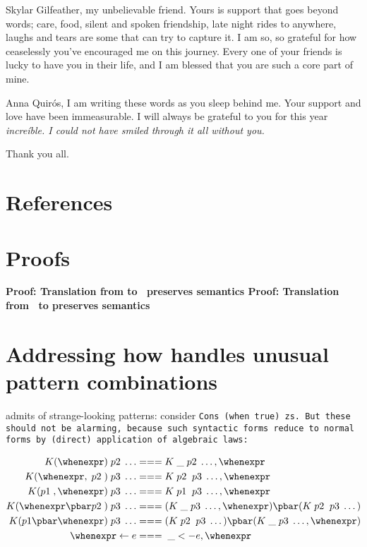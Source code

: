 \documentclass[manuscript,screen,review, 12pt, nonacm]{acmart}
\begin{document}
Skylar Gilfeather, my unbelievable friend. Yours is support that goes
beyond words; care, food, silent and spoken friendship, late night rides to
anywhere, laughs and tears are some that can try to capture it. I am so, so
grateful for how ceaselessly you've encouraged me on this journey. Every one
of your friends is lucky to have you in their life, and I am blessed that 
you are such a core part of mine. 

Anna Quirós, I am writing these words as you sleep behind me. Your support
and love have been immeasurable. I will always be grateful to you for this
year \it{increíble}. I could not have smiled through it all without you. 

Thank you all. 

\section{References}



\renewcommand\thesection{\Alph{section}}
\setcounter{section}{0}
\section{Proofs}
\begin{outline}
\1 \bf{Proof: Translation from \VMinus to \D\ preserves semantics }
\1 \bf{Proof: Translation from \PPlus\ to \VMinus preserves semantics }
\end{outline}

\section{Addressing how \PPlus handles unusual pattern combinations}
\label{ppweird}
    \PPlus admits of strange-looking patterns: consider \tt{Cons (when true)
    zs}. But these should not be alarming, because such syntactic forms reduce
    to normal forms by (direct) application of algebraic laws: 

    \begin{align}
      K (\whenexpr) \;p2\; \dots &=== K \;\_ \;p2\; \dots, \whenexpr \\
      K (\whenexpr, \;p2\;) \;p3\; \dots  &=== K \;p2\; \;p3\; \dots, \whenexpr \\
      K (p1\;, \whenexpr) \;p3\; \dots  &=== K \;p1\; \;p3\; \dots, \whenexpr \\
      K (\whenexpr \pbar p2\;) \;p3\; \dots &=== (K \;\_ \;p3\; \dots, \whenexpr) \pbar (K \;p2\; \;p3\; \dots) \\
      K (p1 \pbar \whenexpr) \;p3\; \dots &=== (K \;p2\; \;p3\; \dots) \pbar (K \;\_ \;p3\; \dots, \whenexpr)  \\
      \whenexpr \leftarrow e &=== \;\_ <- e, \whenexpr
    \end{align}   
    
\end{document}
